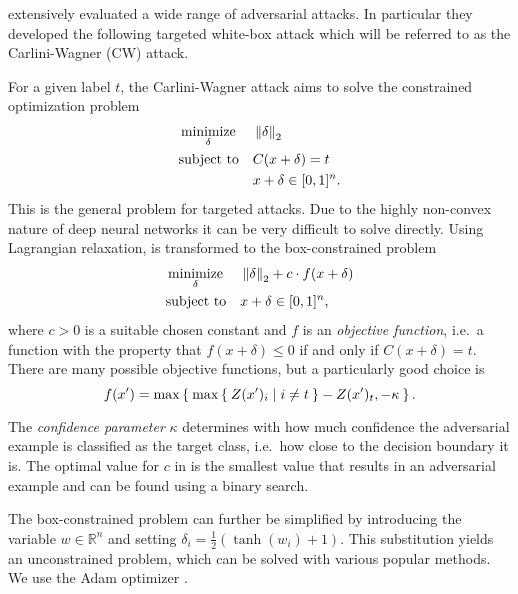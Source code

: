 \citet{carlini} extensively evaluated a wide range of adversarial attacks.
In particular they developed the following targeted white-box attack which will be referred to as the Carlini-Wagner (CW) attack.

For a given label $t$, the Carlini-Wagner attack aims to solve the constrained optimization problem
\begin{equation}
\label{eq:generaltarget}
\begin{aligned}
& \operatorname*{minimize}_{\delta} && \left \lVert \delta \right \rVert _{2} \\
& \text{subject to} && C(x + \delta) = t \\
& && x + \delta \in [0,1]^n
\text{.}
\end{aligned}
\end{equation}
This is the general problem for targeted attacks.
Due to the highly non-convex nature of deep neural networks it can be very difficult to solve directly.
Using Lagrangian relaxation,  is transformed to the box-constrained problem
\begin{equation}
\label{eq:cwproblem}
\begin{aligned}
& \operatorname*{minimize}_{\delta} && \left \lVert \delta \right \rVert _{2} + c \cdot f(x + \delta)\\
& \text{subject to} && x + \delta \in [0,1]^n
\text{,}
\end{aligned}
\end{equation}
where $c > 0$ is a suitable chosen constant and $f$ is an \emph{objective function}, i.e.\ a function with the property that
$f(x + \delta) \leq 0$ if and only if $C(x + \delta) = t$.
There are many possible objective functions, but a particularly good choice is
\begin{equation}
\label{eq:cwobjective}
f(x') = \max \Set{ \max \Set{Z(x')_i | i \neq t } - Z(x')_t, -\kappa } \text{.}
\end{equation}%

The \emph{confidence parameter} $\kappa$ determines with how much confidence the adversarial example is classified as the target class, i.e.\ how close to the decision boundary it is.
The optimal value for $c$ in  is the smallest value that results in an adversarial example and can be found using a binary search.

The box-constrained problem can further be simplified by introducing the variable $w \in \mathbb{R}^n$ and setting $\delta_i = \frac{1}{2} (\tanh(w_i) + 1)$.
This substitution yields an unconstrained problem, which can be solved with various popular methods. We use the Adam optimizer \citep{adam}.

